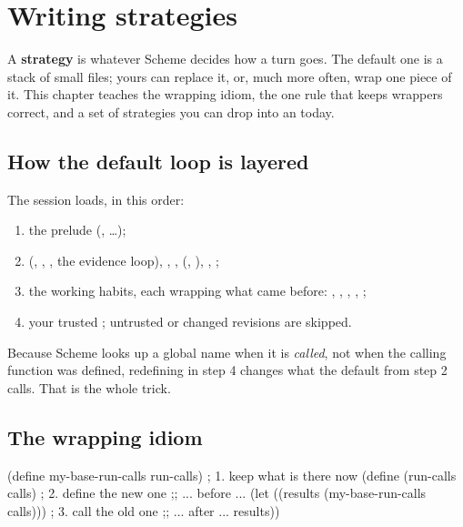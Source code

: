 \chapter{Writing strategies}
\label{ch:strategies}

A \textbf{strategy} is whatever Scheme decides how a turn goes. The default
one is a stack of small files; yours can replace it, or, much more often,
wrap one piece of it. This chapter teaches the wrapping idiom, the one rule
that keeps wrappers correct, and a set of strategies you can drop into an
 today.

\section{How the default loop is layered}

The session loads, in this order:

\begin{enumerate}
  \item the prelude (, \ldots);
  \item {} (, ,
    , the evidence loop), ,
    ,  (,
    ), , ;
  \item the working habits, each wrapping what came before:
    , , ,
    , ;
  \item your trusted ; untrusted or changed revisions are skipped.
\end{enumerate}

Because Scheme looks up a global name when it is \emph{called}, not when
the calling function was defined, redefining  in step 4
changes what the default  from step 2 calls. That is the
whole trick.

\section{The wrapping idiom}

\begin{scm}
(define my-base-run-calls run-calls)       ; 1. keep what is there now
(define (run-calls calls)                  ; 2. define the new one
  ;; ... before ...
  (let ((results (my-base-run-calls calls)))   ; 3. call the old one
    ;; ... after ...
    results))
\end{scm}

